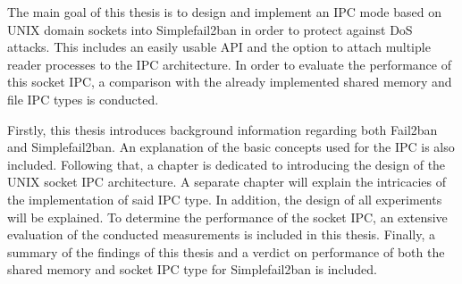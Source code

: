 The main goal of this thesis is to design and implement an \ac{IPC} mode based on UNIX domain sockets into Simplefail2ban in order to protect against \ac{DoS} attacks.
This includes an easily usable \ac{API} and the option to attach multiple reader processes to the \ac{IPC} architecture.
In order to evaluate the performance of this socket \ac{IPC}, a comparison with the already implemented shared memory and file \ac{IPC} types is conducted.

Firstly, this thesis introduces background information regarding both Fail2ban and Simplefail2ban.
An explanation of the basic concepts used for the \ac{IPC} is also included.
Following that, a chapter is dedicated to introducing the design of the UNIX socket \ac{IPC} architecture.
A separate chapter will explain the intricacies of the implementation of said \ac{IPC} type.
In addition, the design of all experiments will be explained.
To determine the performance of the socket \ac{IPC}, an extensive evaluation of the conducted measurements is included in this thesis.
Finally, a summary of the findings of this thesis and a verdict on performance of both the shared memory and socket \ac{IPC} type for Simplefail2ban is included.